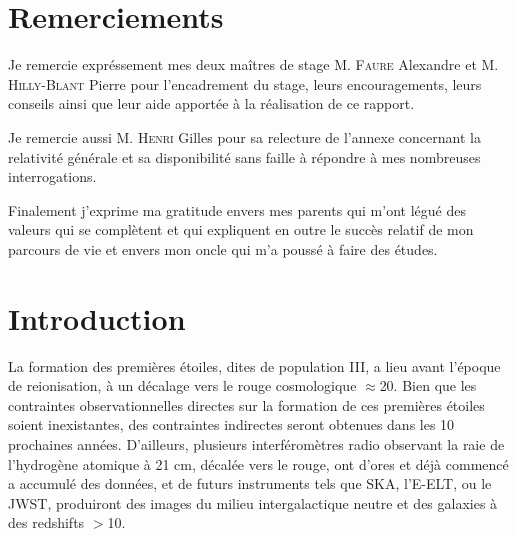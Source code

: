 \documentclass[10pt, a4paper]{report}
\numberwithin{equation}{subsection}
\begin{document}
\renewcommand{\contentsname}{Sommaire}
\renewcommand{\bibname}{Références}



\tableofcontents


\chapter*{Remerciements}
Je remercie expréssement mes deux maîtres de stage M. \textsc{Faure} Alexandre et M. \textsc{Hilly-Blant} Pierre pour l'encadrement du stage, leurs encouragements, leurs conseils ainsi que leur aide apportée à la réalisation de ce rapport.

Je remercie aussi M. \textsc{Henri} Gilles pour sa relecture de l'annexe concernant la relativité générale et sa disponibilité sans faille à répondre à mes nombreuses interrogations.

Finalement j'exprime ma gratitude envers mes parents qui m'ont légué des valeurs qui se complètent et qui expliquent en outre le succès relatif de mon parcours de vie et envers mon oncle qui m'a poussé à faire des études.
 

\chapter*{Introduction}
La formation des premières étoiles, dites de population III, a lieu avant l'époque de reionisation, à un décalage vers le rouge cosmologique $\approx$20. Bien que les contraintes observationnelles directes sur la formation de ces premières étoiles soient inexistantes, des contraintes indirectes seront obtenues dans les 10 prochaines années. D'ailleurs, plusieurs interféromètres radio observant la raie de l'hydrogène atomique à 21 cm, décalée vers le rouge, ont d'ores et déjà commencé a accumulé des données, et de futurs instruments tels que SKA, l'E-ELT, ou le JWST, produiront des images du milieu intergalactique neutre et des galaxies à des redshifts $>$10.
\end{document}
